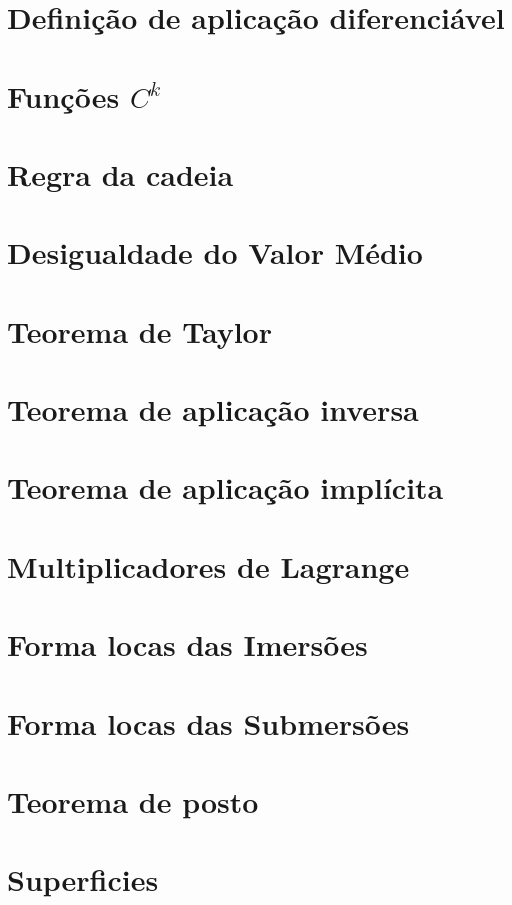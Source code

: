 \section{Definição de aplicação diferenciável}

\section{Funções \texorpdfstring{$C^{k}$}{Ck}}

\section{Regra da cadeia}

\section{Desigualdade do Valor Médio}

\section{Teorema de Taylor}

\section{Teorema de aplicação inversa}

\section{Teorema de aplicação implícita}

\section{Multiplicadores de Lagrange}

\section{Forma locas das Imersões}

\section{Forma locas das Submersões}

\section{Teorema de posto}

\section{Superficies}

